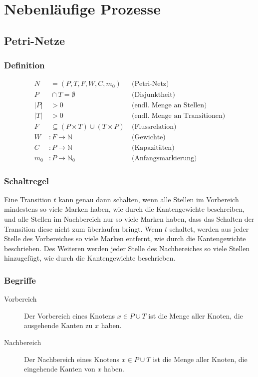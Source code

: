 \documentclass{article}
\begin{document}
\section{Nebenläufige Prozesse}
\subsection{Petri-Netze}
\subsubsection{Definition}
\begin{align}
    N &\:= (P, T, F, W, C, m_0) &\: \text{(Petri-Netz)}\\
    P &\:\cap T = \emptyset &\: \text{(Disjunktheit)}\\
    |P| &\:> 0 &\:\text{(endl. Menge an Stellen)}\\
    |T| &\:> 0 &\:\text{(endl. Menge an Transitionen)}    \\
    F &\:\subseteq (P \times T) \cup (T \times P) &\:\text{(Flussrelation)}\\
    W&:F\rightarrow \mathbb{N} &\:\text{(Gewichte)}\\
    C&:P\rightarrow \mathbb{N} &\:\text{(Kapazitäten)}\\
    m_0&:P\rightarrow \mathbb{N}_0 &\:\text{(Anfangsmarkierung)}
\end{align}
\subsubsection{Schaltregel}
Eine Transition $t$ kann genau dann schalten, wenn alle Stellen im Vorbereich mindestens so viele Marken haben, wie durch die Kantengewichte beschreiben, und alle Stellen im Nachbereich nur so viele Marken haben, dass das Schalten der Transition diese nicht zum überlaufen bringt. Wenn $t$ schaltet, werden aus jeder Stelle des Vorbereiches so viele Marken entfernt, wie durch die Kantengewichte beschrieben. Des Weiteren werden jeder Stelle des Nachbereiches so viele Stellen hinzugefügt, wie durch die Kantengewichte beschrieben.
\subsubsection{Begriffe}
\begin{description}
    \item[Vorbereich] Der Vorbereich eines Knotens $x\in P \cup T$ ist die Menge aller Knoten, die ausgehende Kanten zu $x$ haben.
    \item[Nachbereich] Der Nachbereich eines Knotens $x\in P\cup T$ ist die Menge aller Knoten, die eingehende Kanten von $x$ haben. 
\end{description}
\end{document}
